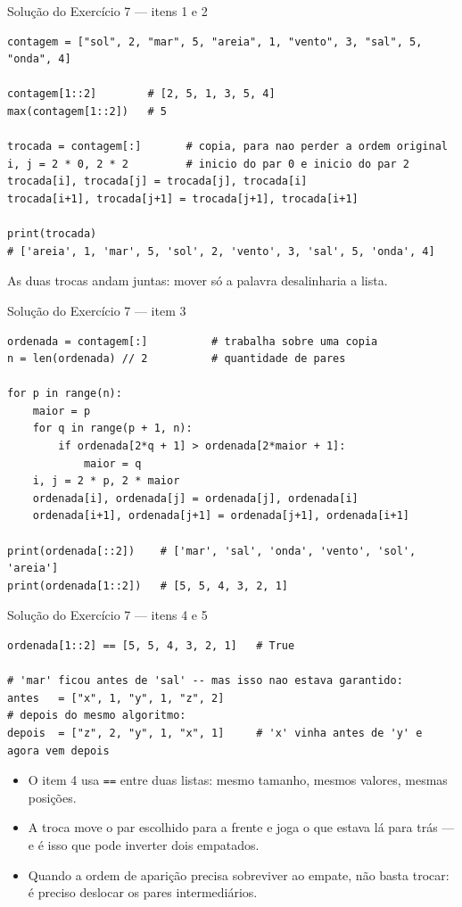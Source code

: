 \documentclass[aspectratio=169]{beamer}
\begin{document}
\begin{frame}[fragile]{Solução do Exercício 7 --- itens 1 e 2}
\begin{lstlisting}
contagem = ["sol", 2, "mar", 5, "areia", 1, "vento", 3, "sal", 5, "onda", 4]

contagem[1::2]        # [2, 5, 1, 3, 5, 4]
max(contagem[1::2])   # 5

trocada = contagem[:]       # copia, para nao perder a ordem original
i, j = 2 * 0, 2 * 2         # inicio do par 0 e inicio do par 2
trocada[i], trocada[j] = trocada[j], trocada[i]
trocada[i+1], trocada[j+1] = trocada[j+1], trocada[i+1]

print(trocada)
# ['areia', 1, 'mar', 5, 'sol', 2, 'vento', 3, 'sal', 5, 'onda', 4]
\end{lstlisting}

As duas trocas andam juntas: mover só a palavra desalinharia a lista.
\end{frame}

\begin{frame}[fragile]{Solução do Exercício 7 --- item 3}
\begin{lstlisting}
ordenada = contagem[:]          # trabalha sobre uma copia
n = len(ordenada) // 2          # quantidade de pares

for p in range(n):
    maior = p
    for q in range(p + 1, n):
        if ordenada[2*q + 1] > ordenada[2*maior + 1]:
            maior = q
    i, j = 2 * p, 2 * maior
    ordenada[i], ordenada[j] = ordenada[j], ordenada[i]
    ordenada[i+1], ordenada[j+1] = ordenada[j+1], ordenada[i+1]

print(ordenada[::2])    # ['mar', 'sal', 'onda', 'vento', 'sol', 'areia']
print(ordenada[1::2])   # [5, 5, 4, 3, 2, 1]
\end{lstlisting}
\end{frame}

\begin{frame}[fragile]{Solução do Exercício 7 --- itens 4 e 5}
\begin{lstlisting}
ordenada[1::2] == [5, 5, 4, 3, 2, 1]   # True

# 'mar' ficou antes de 'sal' -- mas isso nao estava garantido:
antes   = ["x", 1, "y", 1, "z", 2]
# depois do mesmo algoritmo:
depois  = ["z", 2, "y", 1, "x", 1]     # 'x' vinha antes de 'y' e agora vem depois
\end{lstlisting}

\begin{itemize}
  \item O item 4 usa \texttt{==} entre duas listas: mesmo tamanho, mesmos valores, mesmas posições.
  \item A troca move o par escolhido para a frente e joga o que estava lá para trás --- e é isso que pode inverter dois empatados.
  \item Quando a ordem de aparição precisa sobreviver ao empate, não basta trocar: é preciso deslocar os pares intermediários.
\end{itemize}
\end{frame}
\end{document}
